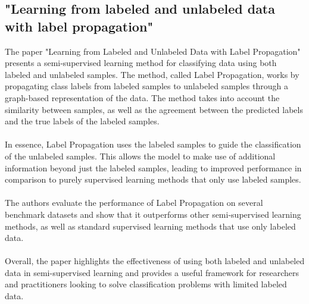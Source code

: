 \documentclass[paper=a4, fontsize=11pt]{scrartcl}
\numberwithin{equation}{section}		%
\numberwithin{figure}{section}			%
\numberwithin{table}{section}				%
\begin{document}
\subsection{"Learning from labeled and unlabeled data with label propagation" \cite{Learning from labeled and unlabeled data with label propagation}}
The paper "Learning from Labeled and Unlabeled Data with Label Propagation" presents a semi-supervised learning method for classifying data using both labeled and unlabeled samples. The method, called Label Propagation, works by propagating class labels from labeled samples to unlabeled samples through a graph-based representation of the data. The method takes into account the similarity between samples, as well as the agreement between the predicted labels and the true labels of the labeled samples.
\\
\\
In essence, Label Propagation uses the labeled samples to guide the classification of the unlabeled samples. This allows the model to make use of additional information beyond just the labeled samples, leading to improved performance in comparison to purely supervised learning methods that only use labeled samples.
\\
\\
The authors evaluate the performance of Label Propagation on several benchmark datasets and show that it outperforms other semi-supervised learning methods, as well as standard supervised learning methods that use only labeled data.
\\
\\
Overall, the paper highlights the effectiveness of using both labeled and unlabeled data in semi-supervised learning and provides a useful framework for researchers and practitioners looking to solve classification problems with limited labeled data.
\end{document}
